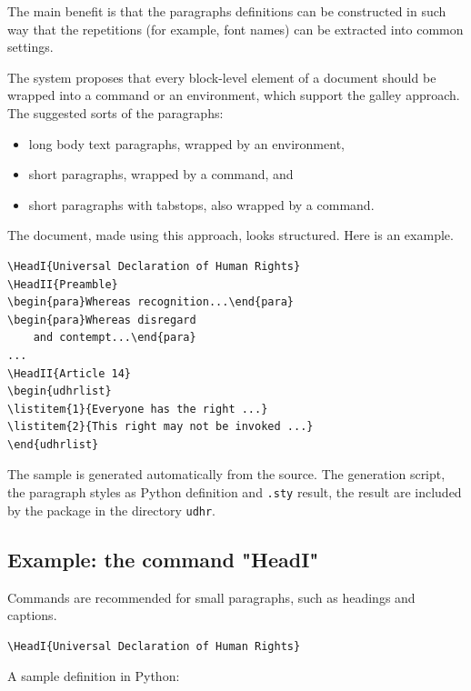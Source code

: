 \documentclass[]{ltugboat}
\begin{document}
The main benefit is that the paragraphs definitions can be constructed in such way that the repetitions (for example, font names) can be extracted into common settings.

The system proposes that every block-level element of a document should be wrapped into a command or an environment, which support the galley approach. The suggested sorts of the paragraphs:

\begin{itemize}
\item long body text paragraphs, wrapped by an environment,
\item short paragraphs, wrapped by a command, and
\item short paragraphs with tabstops, also wrapped by a command.
\end{itemize}

The document, made using this approach, looks structured. Here is an example.

\begin{verbatim}
\HeadI{Universal Declaration of Human Rights}
\HeadII{Preamble}
\begin{para}Whereas recognition...\end{para}
\begin{para}Whereas disregard
    and contempt...\end{para}
...
\HeadII{Article 14}
\begin{udhrlist}
\listitem{1}{Everyone has the right ...}
\listitem{2}{This right may not be invoked ...}
\end{udhrlist}
\end{verbatim}

The sample is generated automatically from the \XML{} source. The generation script, the paragraph styles as Python definition and \verb|.sty| result, the result are included by the package in the directory \verb|udhr|.

\subsection{Example: the command "HeadI"}

Commands are recommended for small paragraphs, such as headings and captions.

\begin{verbatim}
\HeadI{Universal Declaration of Human Rights}
\end{verbatim}

A sample definition in Python:
\end{document}

